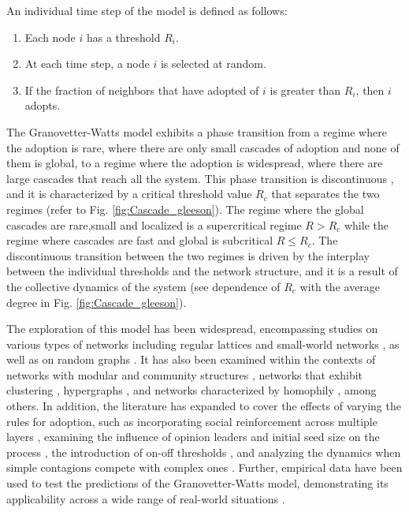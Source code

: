 \begin{theorem}
    \sffamily\small
    An individual time step of the model is defined as follows:
    \begin{enumerate}
        \item Each node $i$ has a threshold $R_i$.
        \item At each time step, a node $i$ is selected at random.
        \item If the fraction of neighbors that have adopted of $i$ is greater than $R_i$, then $i$ adopts.
    \end{enumerate}
\end{theorem}

The Granovetter-Watts model exhibits a phase transition from a regime where the adoption is rare, where there are only small cascades of adoption and none of them is global, to a regime where the adoption is widespread, where there are large cascades that reach all the system. This phase transition is discontinuous \cite{watts-2002,gleeson-2007}, and it is characterized by a critical threshold value $R_c$ that separates the two regimes (refer to Fig. \ref{fig:Cascade_gleeson}). The regime where the global cascades are rare,small and localized is a supercritical regime $R > R_c$ while the regime where cascades are fast and global is subcritical $R \leq R_c$. The  discontinuous transition between the two regimes is driven by the interplay between the individual thresholds and the network structure, and it is a result of the collective dynamics of the system (see dependence of $R_c$ with the average degree in Fig. \ref{fig:Cascade_gleeson}).

The exploration of this model has been widespread, encompassing studies on various types of networks including regular lattices and small-world networks \cite{centola-2007}, as well as on random graphs \cite{gleeson-2007}. It has also been examined within the contexts of networks with modular and community structures \cite{gleeson-2008}, networks that exhibit clustering \cite{hackett-2011,hackett-2013}, hypergraphs \cite{de-arruda-2020}, and networks characterized by homophily \cite{diaz-diaz-2022}, among others. In addition, the literature has expanded to cover the effects of varying the rules for adoption, such as incorporating social reinforcement across multiple layers \cite{chen-2018}, examining the influence of opinion leaders and initial seed size on the process \cite{liu-2018, singh-2013}, the introduction of on-off thresholds \cite{dodds-2013}, and analyzing the dynamics when simple contagions compete with complex ones \cite{czaplicka-2016, min-2018, diaz-diaz-2022}. Further, empirical data have been used to test the predictions of the Granovetter-Watts model, demonstrating its applicability across a wide range of real-world situations \cite{centola-2010, karimi-2013, karsai-2014, rosenthal-2015, karsai-2016, mnsted-2017, unicomb-2018, guilbeault-2021}.

